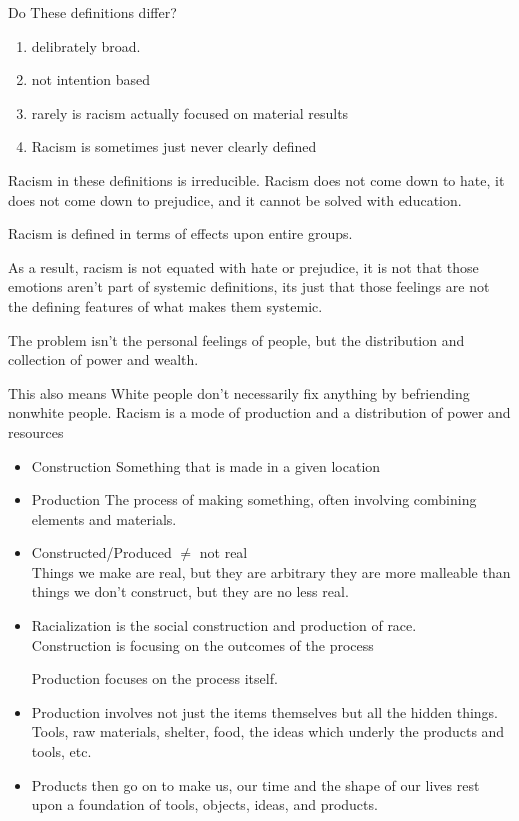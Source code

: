 \documentclass{report}
\begin{document}
Do These definitions differ?
\begin{mdframed}
    \begin{enumerate}
        \item delibrately broad.
        \item not intention based
        \item rarely is racism actually focused on material results
        \item Racism is sometimes just never clearly defined
    \end{enumerate}

    Racism in these definitions is irreducible. Racism
    does not come down to hate, it does not come down
    to prejudice, and it cannot be solved with education.

    Racism is defined in terms of effects upon entire groups.

    As a result, racism is not equated with hate or prejudice,
    it is not that those emotions aren't part of systemic
    definitions, its just that those feelings are not the
    defining features of what makes them systemic.

    The problem isn't the personal feelings of people, but the
    distribution and collection of power and wealth.

    This also means White people don't necessarily fix anything
    by befriending nonwhite people. Racism is a mode of production
    and a distribution of power and resources
\end{mdframed}

\begin{mdframed}
    \begin{itemize}
        \item Construction
            Something that is made in a given location
        \item Production
            The process of making something, often involving
            combining elements and materials.
        \item Constructed/Produced $\ne$ not real
            \\
            Things we make are real, but they are arbitrary
            they are more malleable than things we don't
            construct, but they are no less real.
        \item Racialization is the social construction and
            production of race.
            \\
            Construction is focusing on the outcomes of the
            process

            Production focuses on the process itself.
        \item Production involves not just the items themselves
            but all the hidden things. Tools, raw materials,
            shelter, food, the ideas which underly the products
            and tools, etc.

        \item Products then go on to make us, our time and
            the shape of our lives rest upon a foundation
            of tools, objects, ideas, and products.
             
    \end{itemize}
\end{mdframed}
\end{document}
